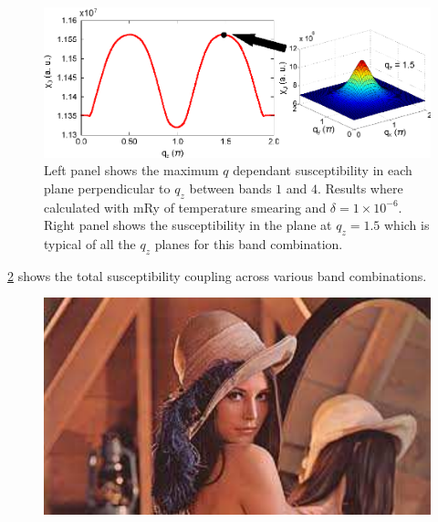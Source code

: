 \begin{figure}[h!]
    \begin{center}
        \includegraphics[scale=0.9]{Chapter3-dHvABaFe2P2/Figures/AngleDepMeasurements/SusceptibilityEnhancement/SusceptibilityEnhancement}
        \caption{Left panel shows the maximum $q$ dependant susceptibility in each plane perpendicular to $q_z$ between bands $1$ and $4$. Results where calculated with \unit[1]{mRy} of temperature smearing and $\delta=1\times10^{-6}$. Right panel shows the susceptibility in the plane at $q_z=1.5$ which is typical of all the $q_z$ planes for this band combination.}
        \label{Fig:3:SusceptbilityEnhancement}
    \end{center}
\end{figure}

\Fig\ref{Fig:3:FullSusceptibility} shows the total susceptibility coupling across various band combinations.

\begin{figure}[h!]
    \begin{center}
        \includegraphics[scale=0.7]{Misc/TODO}
        \caption{}
        \label{Fig:3:FullSusceptibility}
    \end{center}
\end{figure}

